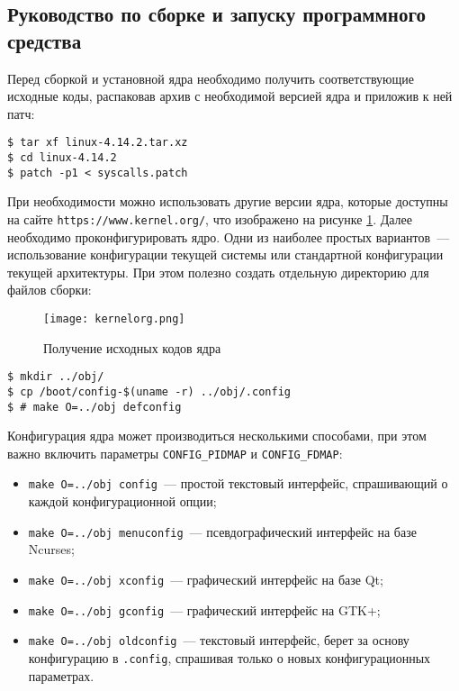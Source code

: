 \subsection{Руководство по сборке и запуску программного средства}

Перед сборкой и установной ядра необходимо получить соответствующие исходные
коды, распаковав архив с необходимой версией ядра и приложив к ней патч:

\medskip
\begin{lstlisting}[style=cstyle]
$ tar xf linux-4.14.2.tar.xz
$ cd linux-4.14.2
$ patch -p1 < syscalls.patch
\end{lstlisting}
\medskip

При необходимости можно использовать другие версии ядра, которые доступны на
сайте \texttt{https://www.kernel.org/}, что изображено на рисунке
\ref{fig:kernelorg}. Далее необходимо проконфигурировать
ядро. Одни из наиболее простых вариантов~--- использование конфигурации текущей
системы или стандартной конфигурации текущей архитектуры. При этом полезно
создать отдельную директорию для файлов сборки:

\begin{figure}
  \centering
  \texttt{[image: kernelorg.png]}
  \caption{Получение исходных кодов ядра}
  \label{fig:kernelorg}
\end{figure}

\medskip
\begin{lstlisting}[style=cstyle]
$ mkdir ../obj/
$ cp /boot/config-$(uname -r) ../obj/.config
$ # make O=../obj defconfig
\end{lstlisting}
\medskip

Конфигурация ядра может производиться несколькими способами, при этом важно
включить параметры \texttt{CONFIG\_PIDMAP} и \texttt{CONFIG\_FDMAP}:
\begin{itemize}
\item \texttt{make O=../obj config}~--- простой текстовый интерфейс,
  спрашивающий о каждой конфигурационной опции;
\item \texttt{make O=../obj menuconfig}~--- псевдографический интерфейс на базе
  Ncurses;
\item \texttt{make O=../obj xconfig}~--- графический интерфейс на базе Qt;
\item \texttt{make O=../obj gconfig}~--- графический интерфейс на GTK+;
\item \texttt{make O=../obj oldconfig}~--- текстовый интерфейс, берет за основу
  конфигурацию в \texttt{.config}, спрашивая только о новых конфигурационных
  параметрах.
\end{itemize}

